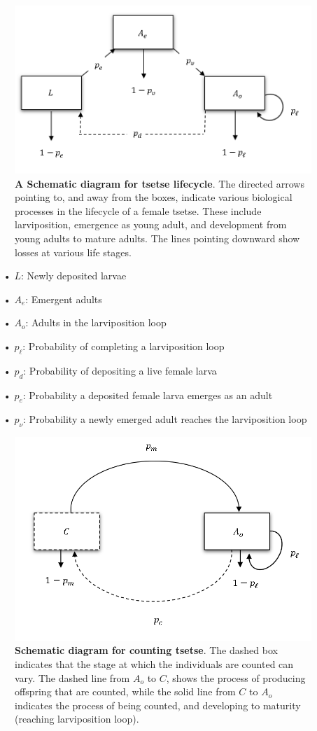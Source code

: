 \documentclass[smallextended]{svjour3}
\begin{document}
\begin{figure}[hbt!]
	\centering
	\includegraphics[width=0.7\linewidth]{Bioflowchart.png}
	\caption{\textbf{A Schematic diagram for tsetse lifecycle}. The directed arrows pointing to, and away from the boxes, indicate various biological processes in the lifecycle of a female tsetse. These include larviposition, emergence as young adult, and development from young adults to mature adults. The lines pointing downward show losses at various life stages.}
	\label{fig:bioflowchart}
\end{figure}

\begin{itemize}
	\item[•] $L$: Newly deposited larvae
	\item[•] $A_{e}$: Emergent adults
	\item[•] $A_{o}$: Adults in the larviposition loop
	\item[•] $p_{\ell}$: Probability of completing a larviposition loop 
	\item[•] $p_d$: Probability of depositing a live female larva 
	\item[•] $p_e$: Probability a deposited female larva emerges as an adult 
	\item[•] $p_{\nu}$: Probability a newly emerged adult reaches the larviposition loop 
\end{itemize}

\begin{figure}[hbt!]
	\centering
	\includegraphics[width=0.7\linewidth]{Compflowchart.png}
	\caption{\textbf{Schematic diagram for counting tsetse}. The dashed box indicates that the stage at which the individuals are counted can vary. The dashed line from $A_{o}$ to $C$, shows the process of producing offspring that are counted, while the solid line from $C$ to $A_{o}$ indicates the process of being counted, and developing to maturity (reaching larviposition loop).}
	\label{fig:compflowchart}
\end{figure}
\end{document}
